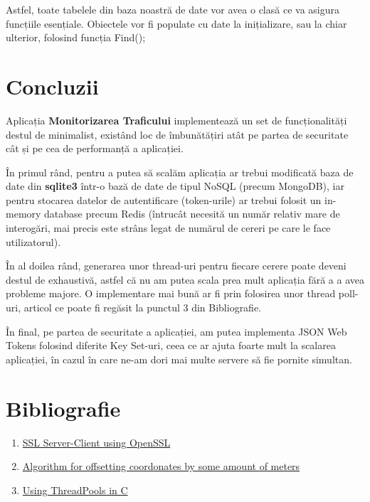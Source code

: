 \documentclass{article}
\begin{document}
Astfel, toate tabelele din baza noastră de date vor avea o clasă ce va asigura funcțiile esențiale. Obiectele vor fi populate cu date la inițializare, sau la chiar ulterior, folosind funcția Find();


\section{Concluzii}
Aplicația \textbf{Monitorizarea Traficului} implementează un set de funcționalități destul de minimalist, existând loc de îmbunătățiri atât pe partea de securitate cât și pe cea de performanță a aplicației. 

În primul rând, pentru a putea să scalăm aplicația ar trebui modificată baza de date din \textbf{sqlite3} într-o bază de date de tipul NoSQL (precum MongoDB), iar pentru stocarea datelor de autentificare (token-urile) ar trebui folosit un in-memory database precum Redis (întrucât necesită un număr relativ mare de interogări, mai precis este strâns legat de numărul de cereri pe care le face utilizatorul).

În al doilea rând, generarea unor thread-uri pentru fiecare cerere poate deveni destul de exhaustivă, astfel că nu am putea scala prea mult aplicația fără a a avea probleme majore. O implementare mai bună ar fi prin folosirea unor thread poll-uri, articol ce poate fi regăsit la punctul 3 din Bibliografie. 

În final, pe partea de securitate a aplicației, am putea implementa JSON Web Tokens folosind diferite Key Set-uri, ceea ce ar ajuta foarte mult la scalarea aplicației, în cazul în care ne-am dori mai multe servere să fie pornite simultan.
\section{Bibliografie}
\begin{enumerate}
    \item   \href{https://aticleworld.com/ssl-server-client-using-openssl-in-c/}{SSL Server-Client using OpenSSL}
    \item   \href{https://gis.stackexchange.com/questions/2951/algorithm-for-offsetting-a-latitude-longitude-by-some-amount-of-meters}{Algorithm for offsetting coordonates by some amount of meters}
    \item   \href{https://nachtimwald.com/2019/04/12/thread-pool-in-c/}{Using ThreadPools in C}
\end{enumerate}
\end{document}
